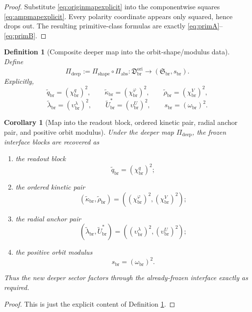 \documentclass[11pt]{article}
\newcommand{\RespShapeReadout}{\widetilde q_{\mathrm{br}}}
\newcommand{\RespShapeCov}{\widetilde\kappa_{\mathrm{br}}}
\newcommand{\RespShapeRelax}{\widetilde\rho_{\mathrm{br}}}
\newcommand{\RespShapeWell}{\widetilde\lambda_{\mathrm{br}}}
\newcommand{\RespShapeEq}{\widetilde U_{\mathrm{br}}^{\ast}}
\newcommand{\ShapeTuple}{\mathfrak S_{\mathrm{br}}}
\newcommand{\ScaleMod}{s_{\mathrm{br}}}
\newcommand{\PrimMap}{\Pi_{\mathrm{shape}}}
\newcommand{\OriginSector}{\mathfrak D_{\mathrm{br}}^{\mathrm{ori}}}
\newcommand{\AbsReadAmp}{\chi_{\mathrm{br}}^{q}}
\newcommand{\AbsCovAmp}{\chi_{\mathrm{br}}^{\varphi}}
\newcommand{\AbsRelaxAmp}{\chi_{\mathrm{br}}^{V}}
\newcommand{\AbsWellAmp}{\upsilon_{\mathrm{br}}^{\lambda}}
\newcommand{\AbsEqAmp}{\upsilon_{\mathrm{br}}^{U}}
\newcommand{\AbsScaleAmp}{\omega_{\mathrm{br}}}
\newcommand{\AbsMap}{\Pi_{\mathrm{abs}}}
\newcommand{\DeepMap}{\Pi_{\mathrm{deep}}}
\newtheorem{definition}{Definition}
\newtheorem{corollary}{Corollary}
\begin{document}
\begin{proof}
Substitute \eqref{eq:originmapexplicit} into the componentwise squares \eqref{eq:ampmapexplicit}. Every polarity coordinate appears only squared, hence drops out. The resulting primitive-class formulas are exactly \eqref{eq:primA}--\eqref{eq:primB}.
\end{proof}

\begin{definition}[Composite deeper map into the orbit-shape/modulus data]
\label{def:deepmap}
Define
\begin{equation}
\DeepMap:=\PrimMap\circ\AbsMap:\OriginSector\longrightarrow(\ShapeTuple,\ScaleMod).
\label{eq:deepmap}
\end{equation}
Explicitly,
\begin{equation}
\RespShapeReadout=(\AbsReadAmp)^2,
\qquad
\RespShapeCov=(\AbsCovAmp)^2,
\qquad
\RespShapeRelax=(\AbsRelaxAmp)^2,
\label{eq:deepshapeA}
\end{equation}
\begin{equation}
\RespShapeWell=(\AbsWellAmp)^2,
\qquad
\RespShapeEq=(\AbsEqAmp)^2,
\qquad
\ScaleMod=(\AbsScaleAmp)^2.
\label{eq:deepshapeB}
\end{equation}
\end{definition}

\begin{corollary}[Map into the readout block, ordered kinetic pair, radial anchor pair, and positive orbit modulus]
\label{cor:blockmap}
Under the deeper map \(\DeepMap\), the frozen interface blocks are recovered as
\begin{enumerate}
    \item the readout block
    \[
    \RespShapeReadout=(\AbsReadAmp)^2;
    \]
    \item the ordered kinetic pair
    \[
    (\RespShapeCov,\RespShapeRelax)=((\AbsCovAmp)^2,(\AbsRelaxAmp)^2);
    \]
    \item the radial anchor pair
    \[
    (\RespShapeWell,\RespShapeEq)=((\AbsWellAmp)^2,(\AbsEqAmp)^2);
    \]
    \item the positive orbit modulus
    \[
    \ScaleMod=(\AbsScaleAmp)^2.
    \]
\end{enumerate}
Thus the new deeper sector factors through the already-frozen interface exactly as required.
\end{corollary}

\begin{proof}
This is just the explicit content of Definition \ref{def:deepmap}.
\end{proof}
\end{document}
